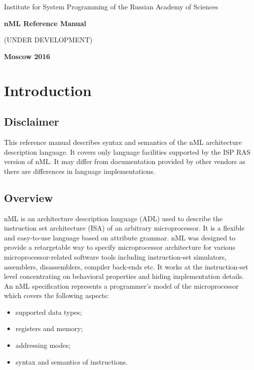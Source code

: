 \documentclass[oneside,final,14pt]{extreport}
\begin{document}
\begin{titlepage}
\begin{center}
\Large{Institute for System Programming of the Russian Academy of Sciences}

\vfill


\bf\Large{nML Reference Manual}

(UNDER DEVELOPMENT)

\vfill

\bf
Moscow 2016
\end{center}


\end{titlepage}

\newpage
{} %
\tableofcontents

\newpage


\chapter{Introduction}

\section{Disclaimer}

This reference manual describes syntax and semantics of the nML architecture
description language. It covers only language facilities supported by the ISP RAS
version of nML. It may differ from documentation provided by other vendors as
there are differences in language implementations.

\section{Overview}

nML is an architecture description language (ADL) used to describe the
instruction set architecture (ISA) of an arbitrary microprocessor. It is a
flexible and easy-to-use language based on attribute grammar. nML was designed
to provide a retargetable way to specify microprocessor architecture for
various microprocessor-related software tools including instruction-set
simulators, assemblers, disassemblers, compiler back-ends etc. It works at
the instruction-set level concentrating on behavioral properties and hiding
implementation details. An nML specification represents a programmer's model
of the microprocessor which covers the following aspects:

\begin{itemize}
\item supported data types;
\item registers and memory;
\item addressing modes;
\item syntax and semantics of instructions.
\end{itemize}
\end{document}
